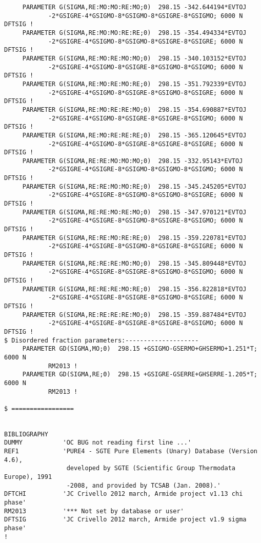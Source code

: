 \documentclass[12pt]{article}
\begin{document}
{\begin{verbatim}
     PARAMETER G(SIGMA,RE:MO:MO:RE:MO;0)  298.15 -342.644194*EVTOJ
            -2*GSIGRE-4*GSIGMO-8*GSIGMO-8*GSIGRE-8*GSIGMO; 6000 N DFTSIG !
     PARAMETER G(SIGMA,RE:MO:MO:RE:RE;0)  298.15 -354.494334*EVTOJ
            -2*GSIGRE-4*GSIGMO-8*GSIGMO-8*GSIGRE-8*GSIGRE; 6000 N DFTSIG !
     PARAMETER G(SIGMA,RE:MO:RE:MO:MO;0)  298.15 -340.103152*EVTOJ
            -2*GSIGRE-4*GSIGMO-8*GSIGRE-8*GSIGMO-8*GSIGMO; 6000 N DFTSIG !
     PARAMETER G(SIGMA,RE:MO:RE:MO:RE;0)  298.15 -351.792339*EVTOJ
            -2*GSIGRE-4*GSIGMO-8*GSIGRE-8*GSIGMO-8*GSIGRE; 6000 N DFTSIG !
     PARAMETER G(SIGMA,RE:MO:RE:RE:MO;0)  298.15 -354.690887*EVTOJ
            -2*GSIGRE-4*GSIGMO-8*GSIGRE-8*GSIGRE-8*GSIGMO; 6000 N DFTSIG !
     PARAMETER G(SIGMA,RE:MO:RE:RE:RE;0)  298.15 -365.120645*EVTOJ
            -2*GSIGRE-4*GSIGMO-8*GSIGRE-8*GSIGRE-8*GSIGRE; 6000 N DFTSIG !
     PARAMETER G(SIGMA,RE:RE:MO:MO:MO;0)  298.15 -332.95143*EVTOJ
            -2*GSIGRE-4*GSIGRE-8*GSIGMO-8*GSIGMO-8*GSIGMO; 6000 N DFTSIG !
     PARAMETER G(SIGMA,RE:RE:MO:MO:RE;0)  298.15 -345.245205*EVTOJ
            -2*GSIGRE-4*GSIGRE-8*GSIGMO-8*GSIGMO-8*GSIGRE; 6000 N DFTSIG !
     PARAMETER G(SIGMA,RE:RE:MO:RE:MO;0)  298.15 -347.970121*EVTOJ
            -2*GSIGRE-4*GSIGRE-8*GSIGMO-8*GSIGRE-8*GSIGMO; 6000 N DFTSIG !
     PARAMETER G(SIGMA,RE:RE:MO:RE:RE;0)  298.15 -359.220781*EVTOJ
            -2*GSIGRE-4*GSIGRE-8*GSIGMO-8*GSIGRE-8*GSIGRE; 6000 N DFTSIG !
     PARAMETER G(SIGMA,RE:RE:RE:MO:MO;0)  298.15 -345.809448*EVTOJ
            -2*GSIGRE-4*GSIGRE-8*GSIGRE-8*GSIGMO-8*GSIGMO; 6000 N DFTSIG !
     PARAMETER G(SIGMA,RE:RE:RE:MO:RE;0)  298.15 -356.822818*EVTOJ
            -2*GSIGRE-4*GSIGRE-8*GSIGRE-8*GSIGMO-8*GSIGRE; 6000 N DFTSIG !
     PARAMETER G(SIGMA,RE:RE:RE:RE:MO;0)  298.15 -359.887484*EVTOJ
            -2*GSIGRE-4*GSIGRE-8*GSIGRE-8*GSIGRE-8*GSIGMO; 6000 N DFTSIG !
$ Disordered fraction parameters:--------------------
     PARAMETER GD(SIGMA,MO;0)  298.15 +GSIGMO-GSERMO+GHSERMO+1.251*T; 6000 N 
            RM2013 !
     PARAMETER GD(SIGMA,RE;0)  298.15 +GSIGRE-GSERRE+GHSERRE-1.205*T; 6000 N 
            RM2013 !

$ =================


BIBLIOGRAPHY
DUMMY           'OC BUG not reading first line ...'
REF1            'PURE4 - SGTE Pure Elements (Unary) Database (Version 4.6), 
                 developed by SGTE (Scientific Group Thermodata Europe), 1991
                 -2008, and provided by TCSAB (Jan. 2008).'
DFTCHI          'JC Crivello 2012 march, Armide project v1.13 chi phase'
RM2013          '*** Not set by database or user'
DFTSIG          'JC Crivello 2012 march, Armide project v1.9 sigma phase'
!
\end{verbatim}
}
\end{document}
